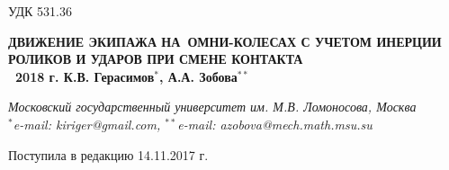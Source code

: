 \begin{flushleft}
УДК 531.36
\end{flushleft}

\begin{center}
\large
\textbf{ ДВИЖЕНИЕ ЭКИПАЖА НА~ОМНИ-КОЛЕСАХ С УЧЕТОМ ИНЕРЦИИ РОЛИКОВ И УДАРОВ ПРИ СМЕНЕ КОНТАКТА \\
\textcopyright \ 2018 г. \quad К.В. Герасимов$^{*}$, А.А. Зобова$^{**}$ }

\textit{ Московский государственный университет им. М.В. Ломоносова, Москва \\
$^*$e-mail: kiriger@gmail.com, $^{**}$e-mail: azobova@mech.math.msu.su }

Поступила в редакцию 14.11.2017 г.

\nocite{mecanum}
\nocite{ZobovaTatarinovAspecty2006}
\nocite{formalskii}
\nocite{zobova2008svobodnye8020851}
\nocite{ZobovaTatarinovPMM}
\nocite{Martynenko2010}
\nocite{borisov}
\nocite{Williams2002}
\nocite{Ashmore2002}
\nocite{Tobolar}
\nocite{KosenkoGerasimov}
\nocite{Tatarinov}
\nocite{Zobova2011}

\vspace{0.3cm}
\normalsize
\end{center}